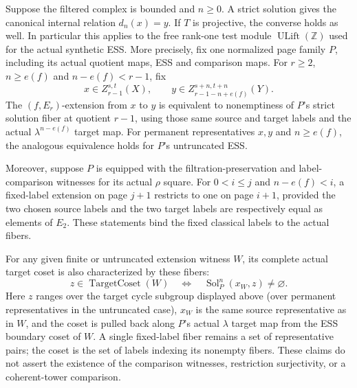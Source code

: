 \begin{proposition}
  \label{prop:strict-ess-fiber-page-relation}
  \leanok
  Suppose the filtered complex is bounded and $n\ge0$.
  A strict solution gives the canonical internal relation $d_n(x)=y$.
  If $T$ is projective, the converse holds as well.
  In particular this applies to the free rank-one test module
  $\operatorname{ULift}(\mathbb Z)$ used for the actual synthetic ESS.
  More precisely, fix one normalized page family $P$, including its actual
  quotient maps, ESS and comparison maps.  For $r\ge2$, $n\ge e(f)$ and
  $n-e(f)<r-1$, fix
  \[
    x\in Z_{r-1}^{s,t}(X),\qquad
    y\in Z_{r-1-n+e(f)}^{s+n,t+n}(Y).
  \]
  The $(f,E_r)$-extension from $x$ to $y$ is equivalent to nonemptiness of
  $P$'s strict solution fiber at quotient $r-1$, using those same source
  and target labels and the actual $\lambda^{n-e(f)}$ target map.
  For permanent representatives $x,y$ and $n\ge e(f)$, the analogous
  equivalence holds for $P$'s untruncated ESS.

  Moreover, suppose $P$ is equipped with the filtration-preservation and
  label-comparison witnesses for its actual $\rho$ square.  For
  $0<i\le j$ and $n-e(f)<i$, a fixed-label extension on page $j+1$
  restricts to one on page $i+1$, provided the two chosen source labels
  and the two target labels are respectively equal as elements of $E_2$.
  These statements bind the fixed classical labels to the actual fibers.

  For any given finite or untruncated extension witness $W$, its complete
  actual target coset is also characterized by these fibers:
  \[
    z\in\operatorname{TargetCoset}(W)
      \quad\Longleftrightarrow\quad
    \operatorname{Sol}_P^n(x_W,z)\ne\varnothing.
  \]
  Here $z$ ranges over the target cycle subgroup displayed above (over
  permanent representatives in the untruncated case), $x_W$ is the same
  source representative as in $W$, and the coset is pulled back along
  $P$'s actual $\lambda$ target map from the ESS boundary coset of $W$.
  A single fixed-label fiber remains a set of representative pairs; the
  coset is the set of labels indexing its nonempty fibers.  These claims
  do not assert the existence of the comparison witnesses, restriction
  surjectivity, or a coherent-tower comparison.
\end{proposition}

